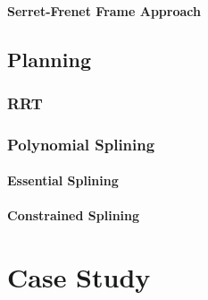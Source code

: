 \documentclass[oneside, 11pt]{book}
\begin{document}
\subsubsection{Serret-Frenet Frame Approach}

\section{Planning}\label{sec:planning}

\subsection{RRT}

\subsection{Polynomial Splining}

\subsubsection{Essential Splining}

\subsubsection{Constrained Splining}

\chapter{Case Study}

\backmatter
\cleardoublepage
{}
{}
\printbibliography[heading=none]

\cleardoublepage
{}
{}
\printindex
\end{document}
